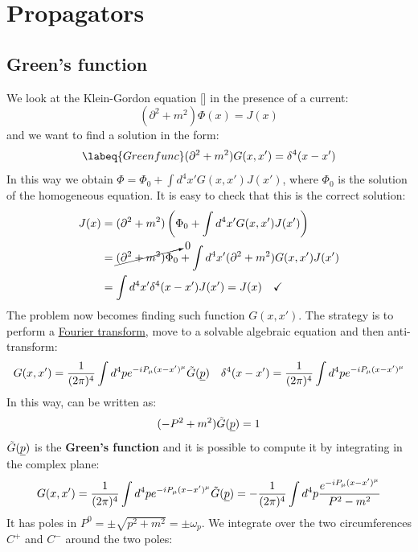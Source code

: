 \documentclass[../main.tex]{subfiles}
\begin{document}
\setchapterpreamble[u]{\margintoc}
\chapter[Propagators]{Propagators\footnotemark[0]}
\section{Green's function}
We look at the Klein-Gordon equation [] in the presence of a current:
\[
(\partial^2+m^2)\Phi(x)=J(x)
\]
and we want to find a solution in the form:
\begin{equation}
\labeq{Greenfunc}
(\partial^2+m^2)G(x,x')=\delta^4(x-x')
\end{equation}
In this way we obtain $\Phi=\Phi_0+\int d^4x'G(x,x')J(x')$, where $\Phi_0$ is the solution of the homogeneous equation. It is easy to check that this is the correct solution:
\begin{align*}
J(x)&=(\partial^2+m^2)\left(\Phi_0+\int d^4x'G(x,x')J(x')\right)\\
&=\cancelto{0}{(\partial^2+m^2)\Phi_0}+\int d^4x'(\partial^2+m^2)G(x,x')J(x')\\
&=\int d^4x'\delta^4(x-x')J(x')=J(x) \quad \checkmark
\end{align*}
The problem now becomes finding such function $G(x,x')$. The strategy is to perform a \href{https://en.wikipedia.org/wiki/Fourier_transform}{Fourier transform}, move to a solvable algebraic equation and then anti-transform:
\[
G(x,x')=\frac{1}{(2\pi)^4}\int d^4pe^{-iP_\mu(x-x')^\mu}\Tilde{G}(\underline{p}) \quad \delta^4(x-x')=\frac{1}{(2\pi)^4}\int d^4pe^{-iP_\mu(x-x')^\mu}
\]
In this way,  can be written as:
\[
(-P^2+m^2)\Tilde{G}(\underline{p})=1
\]
$\Tilde{G}(\underline{p})$ is the \textbf{Green's function} and it is possible to compute it by integrating in the complex plane:
\[
G(x,x')=\frac{1}{(2\pi)^4}\int d^4pe^{-iP_\mu(x-x')^\mu}\Tilde{G}(\underline{p})=-\frac{1}{(2\pi)^4}\int d^4p\frac{e^{-iP_\mu(x-x')^\mu}}{P^2-m^2}
\]
It has poles in $P^0=\pm\sqrt{p^2+m^2}=\pm\omega_p$.
We integrate over the two circumferences $C^+$ and $C^-$ around the two poles:
\end{document}
